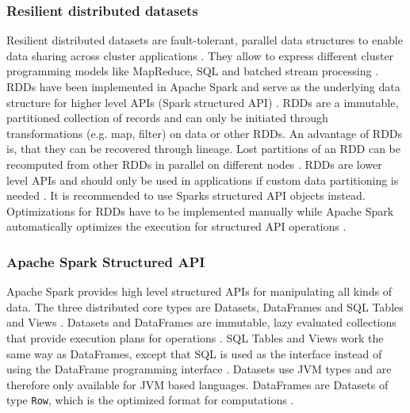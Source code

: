 \subsubsection{Resilient distributed datasets}
Resilient distributed datasets are fault-tolerant, parallel data structures to enable data sharing across cluster applications \cite{Zaharia2012RDDs}. They allow to express different cluster programming models like MapReduce, SQL and batched stream processing \cite{Zaharia2012RDDs}. RDDs have been implemented in Apache Spark and serve as the underlying data structure for higher level APIs (Spark structured API) \cite{Zaharia2012RDDs}.
RDDs are a immutable, partitioned collection of records and can only be initiated through transformations (e.g. map, filter) on data or other RDDs.
An advantage of RDDs is, that they can be recovered through lineage. Lost partitions of an RDD can be recomputed from other RDDs in parallel on different nodes \cite{Zaharia2012RDDs}. 
RDDs are lower level APIs and should only be used in applications if custom data partitioning is needed \cite{Chambers2018Spark}. It is recommended to use Sparks structured API objects instead. Optimizations for RDDs have to be implemented manually while Apache Spark automatically optimizes the execution for structured API operations \cite{Chambers2018Spark}.


\subsubsection{Apache Spark Structured API}
Apache Spark provides high level structured APIs for manipulating all kinds of data. The three distributed core types are Datasets, DataFrames and SQL Tables and Views \cite{Chambers2018Spark}.
Datasets and DataFrames are immutable, lazy evaluated collections that provide execution plans for operations \cite{Chambers2018Spark}. SQL Tables and Views work the same way as DataFrames, except that SQL is used as the interface instead of using the DataFrame programming interface \cite{Chambers2018Spark}.
Datasets use JVM types and are therefore only available for JVM based languages. DataFrames are Datasets of type \texttt{Row}, which is the optimized format for computations \cite{Chambers2018Spark}.


